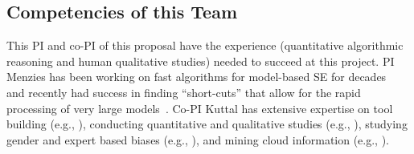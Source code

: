 \documentclass[twoside]{NSF}
\newcommand{\IT}{{\sffamily {\em \mbox{ADVICE}}}}
\newcommand{\ITTT}{\mbox{{\IT}-2}}
\newenvironment{formal}{%
  \vspace{-5pt}\def\FrameCommand{%
     \vspace{-10pt} \hspace{1pt}%
    {\color{darkblue}\vrule width 2pt}%
    {\color{formalshade}\vrule width 4pt}%
    \colorbox{formalshade}%
  }%
  \MakeFramed{\advance\hsize-\width\FrameRestore}%
  \noindent\hspace{-1pt}%
  \begin{adjustwidth}{}{7pt}%
     
}
{%
  \vspace{0pt}\end{adjustwidth}\endMakeFramed%
}
\begin{document}
\begin{nsfdescription}


\subsection{Competencies of this Team}

This  PI and co-PI of this proposal have the experience (quantitative algorithmic reasoning and human qualitative studies) needed to succeed at this project.  PI Menzies has been working on fast algorithms for model-based SE for decades~\cite{DBLP:conf/re/FeatherM02,DBLP:journals/computer/MenziesOR07}
 and recently  had success in finding ``short-cuts''
 that allow for the rapid processing of very
 large models~\cite{Mathew17,nair18,lustosa21,lustosa22}.
 Co-PI Kuttal has extensive expertise on tool building (e.g., \cite{KuttalSSR11,tochipaper,KuttalSR13-chi}), conducting quantitative and qualitative studies (e.g., \cite{Abimgitposter2022,Diwanjiposter2022,Zhou2018,Kuttal2021, MartosKK16}), studying gender and expert based biases (e.g., \cite{Kuttal2021g, Kuttal2019, Alexposter2022, KuttalKMB21}), and mining cloud information (e.g., \cite{sarma2016hiring, KuttalCWBS21, KuttalSRW18, abs-1810-13062}). 



\end{nsfdescription}
\end{document}
